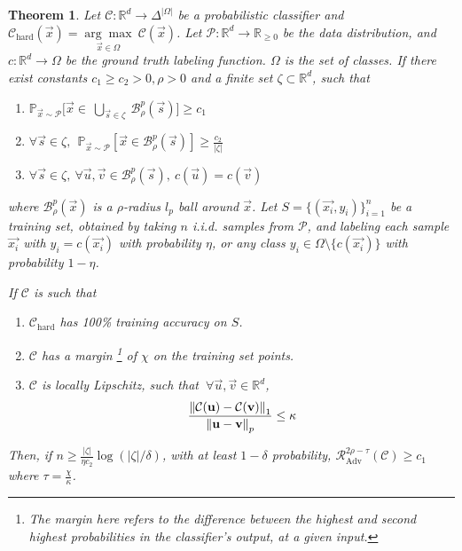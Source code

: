 \documentclass{ociamthesis}
\newtheorem{theorem}{Theorem}
\begin{document}
\begin{theorem}
    \label{theorem:Lipschitzness-extension}
    Let $\mathcal{C}: \mathbb{R}^d \to \Delta^{|\Omega|}$ be a probabilistic
    classifier and $\mathcal{C}_\text{hard}(\vec{x}) = \underset{\vec{x} \in
    \Omega}{\arg\max}~\mathcal{C}(\vec{x})$. Let $\mathcal{P}: \mathbb{R}^d \to
    \mathbb{R}_{\geq 0}$ be the data distribution, and $c: \mathbb{R}^d \to
    \Omega$ be the ground truth labeling function. $\Omega$ is the set of
    classes. If there exist constants $c_1 \geq c_2 > 0, \rho > 0$ and a finite
    set $\zeta \subset \mathbb{R}^d$, such that
    \begin{enumerate}
        \item $\mathbb{P}_{\vec{x} \sim \mathcal{P}} \bigg [\vec{x}\in
        ~\underset{\vec{s} \in \zeta}{\bigcup}~\mathcal{B}_\rho^p(\vec{s}) \bigg
        ] \geq c_1$
        \item $\forall \vec{s} \in \zeta,~~ \mathbb{P}_{\vec{x} \sim
        \mathcal{P}} [\vec{x}\in \mathcal{B}_\rho^p(\vec{s})] \geq
        \frac{c_2}{|\zeta|}$
        \item $\forall \vec{s} \in \zeta,~\forall \vec{u}, \vec{v} \in
        \mathcal{B}_\rho^p(\vec{s}),~c(\vec{u}) = c(\vec{v})$
    \end{enumerate}
    where $\mathcal{B}^p_\rho(\vec{x})$ is a $\rho$-radius $l_p$ ball around
    $\vec{x}$. Let $S=\{(\vec{x_i},y_i)\}_{i=1}^n$ be a training set, obtained
    by taking $n$ i.i.d. samples from $\mathcal{P}$, and labeling each sample
    $\vec{x_i}$ with $y_i=c(\vec{x_i})$ with probability $\eta$, or any class
    $y_i\in\Omega\setminus\{c(\vec{x_i})\}$ with probability $1-\eta$.
    
    If $\mathcal{C}$ is such that 
    \begin{enumerate}
        \item $\mathcal{C}_\text{hard}$ has 100\% training accuracy on $S$. 
        \item $\mathcal{C}$ has a margin \footnote{The margin here refers to the
        difference between the highest and second highest probabilities in the
        classifier's output, at a given input.} of $\chi$ on the training set
        points.
        \item $\mathcal{C}$ is locally Lipschitz, such that $~\forall \vec{u},
        \vec{v} \in \mathbb{R}^d$,
            \begin{equation*}
                \frac{\mathrm{\left\lVert\mathcal{C}({\mathbf{u}}) - \mathcal{C}({\mathbf{v}})
                \right\rVert}_1}
                    {\mathrm{\left\lVert{\mathbf{u}} - {\mathbf{v}}\right\rVert}_p} 
                \leq \kappa
            \end{equation*}
    \end{enumerate}
    Then, if $n \geq \frac{|\zeta|}{\eta c_2} \log (|\zeta|/\delta)$, with at
    least $1-\delta$ probability,
    $\mathcal{R}_{\text{Adv}}^{2\rho-\tau}(\mathcal{C}) \geq c_1$ where $\tau =
    \frac{\chi}{\kappa}$.
\end{theorem}
\end{document}
